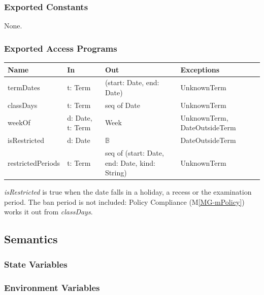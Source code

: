 \documentclass[12pt, titlepage]{article}
\newcommand{\mref}[1]{M\ref{MG-#1}}
\begin{document}
\subsubsection{Exported Constants}

None.

\subsubsection{Exported Access Programs}

\begin{center}\small
\begin{tabular}{>{\raggedright\arraybackslash}p{3.4cm} >{\raggedright\arraybackslash}p{3.3cm} >{\raggedright\arraybackslash}p{4.1cm} >{\raggedright\arraybackslash}p{3.8cm}}
\hline
\textbf{Name} & \textbf{In} & \textbf{Out} & \textbf{Exceptions} \\
\hline
termDates & t: Term & (start: Date, end: Date) & UnknownTerm \\
classDays & t: Term & seq of Date & UnknownTerm \\
weekOf & d: Date, t: Term & Week & UnknownTerm, DateOutsideTerm \\
isRestricted & d: Date & $\mathbb{B}$ & DateOutsideTerm \\
restrictedPeriods & t: Term & seq of (start: Date, end: Date, kind: String) & UnknownTerm \\
\hline
\end{tabular}
\end{center}

\noindent \textit{isRestricted} is true when the date falls in a holiday, a
recess or the examination period. The ban period is not included: Policy
Compliance (\mref{mPolicy}) works it out from \textit{classDays}.

\subsection{Semantics}

\subsubsection{State Variables}


\subsubsection{Environment Variables}
\end{document}
